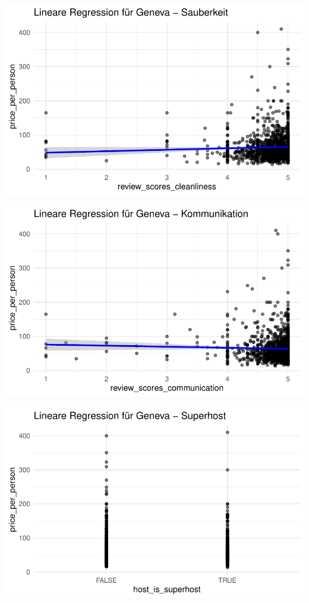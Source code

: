 \documentclass[
  journal,
]{IEEEtran}%
\begin{document}
\includegraphics{main_files/figure-pdf/unnamed-chunk-16-2.pdf}

\includegraphics{main_files/figure-pdf/unnamed-chunk-16-3.pdf}

\includegraphics{main_files/figure-pdf/unnamed-chunk-16-4.pdf}
\end{document}

